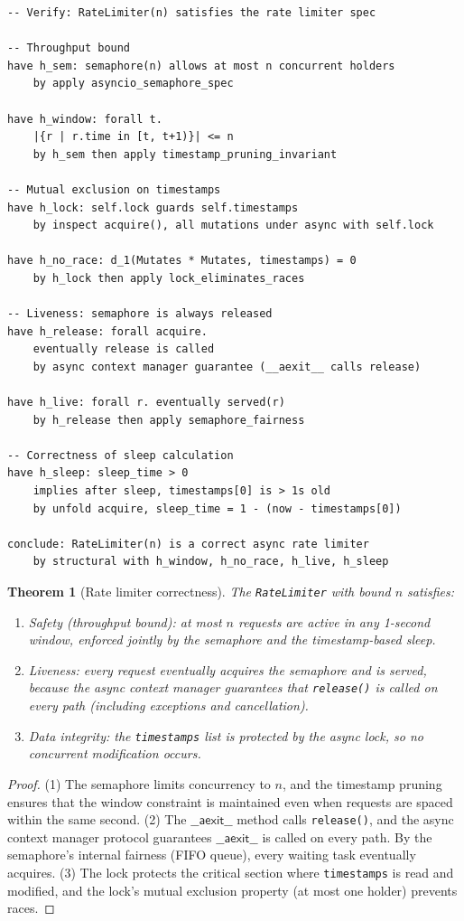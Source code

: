 \documentclass[11pt,a4paper]{report}
\theoremstyle{definition}
\theoremstyle{plain}
\newtheorem{theorem}[definition]{Theorem}
\begin{document}
\begin{lstlisting}[style=proof]
-- Verify: RateLimiter(n) satisfies the rate limiter spec

-- Throughput bound
have h_sem: semaphore(n) allows at most n concurrent holders
    by apply asyncio_semaphore_spec

have h_window: forall t.
    |{r | r.time in [t, t+1)}| <= n
    by h_sem then apply timestamp_pruning_invariant

-- Mutual exclusion on timestamps
have h_lock: self.lock guards self.timestamps
    by inspect acquire(), all mutations under async with self.lock

have h_no_race: d_1(Mutates * Mutates, timestamps) = 0
    by h_lock then apply lock_eliminates_races

-- Liveness: semaphore is always released
have h_release: forall acquire.
    eventually release is called
    by async context manager guarantee (__aexit__ calls release)

have h_live: forall r. eventually served(r)
    by h_release then apply semaphore_fairness

-- Correctness of sleep calculation
have h_sleep: sleep_time > 0
    implies after sleep, timestamps[0] is > 1s old
    by unfold acquire, sleep_time = 1 - (now - timestamps[0])

conclude: RateLimiter(n) is a correct async rate limiter
    by structural with h_window, h_no_race, h_live, h_sleep
\end{lstlisting}

\begin{theorem}[Rate limiter correctness]
The \lstinline[style=python]{RateLimiter} with bound $n$ satisfies:
\begin{enumerate}
  \item \emph{Safety} (throughput bound): at most $n$ requests are active
    in any 1-second window, enforced jointly by the semaphore and the
    timestamp-based sleep.
  \item \emph{Liveness}: every request eventually acquires the semaphore
    and is served, because the async context manager guarantees that
    \texttt{release()} is called on every path (including exceptions
    and cancellation).
  \item \emph{Data integrity}: the \lstinline[style=python]{timestamps}
    list is protected by the async lock, so no concurrent modification
    occurs.
\end{enumerate}
\end{theorem}
\begin{proof}
(1) The semaphore limits concurrency to $n$, and the timestamp pruning
ensures that the window constraint is maintained even when requests are
spaced within the same second.  (2) The $\mathsf{\_\_aexit\_\_}$ method
calls \texttt{release()}, and the async context manager protocol
guarantees $\mathsf{\_\_aexit\_\_}$ is called on every path.  By the
semaphore's internal fairness (FIFO queue), every waiting task eventually
acquires.  (3) The lock protects the critical section where
\texttt{timestamps} is read and modified, and the lock's mutual exclusion
property (at most one holder) prevents races.
\end{proof}
\end{document}
